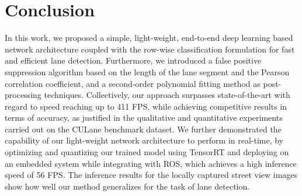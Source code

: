 \documentclass[conference]{IEEEtran}
\begin{document}
\section{Conclusion}
\label{sec:conc}
In this work, we proposed a simple, light-weight, end-to-end deep learning based network architecture coupled with the row-wise classification formulation for fast and efficient lane detection. Furthermore, we introduced a false positive suppression algorithm based on the length of the lane segment and the Pearson correlation coefficient, and a second-order polynomial fitting method as post-processing techniques. Collectively, our approach surpasses state-of-the-art with regard to speed reaching up to 411 FPS, while achieving competitive results in terms of accuracy, as justified in the qualitative and quantitative experiments carried out on the CULane benchmark dataset. We further demonstrated the capability of our light-weight network architecture to perform in real-time, by optimizing and quantizing our trained model using TensorRT and deploying on an embedded system while integrating with ROS, which achieves a high inference speed of 56 FPS. The inference results for the locally captured street view images show how well our method generalizes for the task of lane detection. 









{


}
\end{document}
